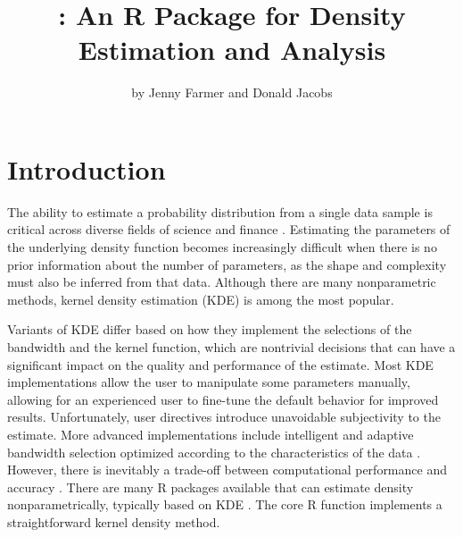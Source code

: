 \title{:  An R Package for Density Estimation and Analysis}
\author{by Jenny Farmer and Donald Jacobs}

\maketitle


\section{Introduction} \label {intro}

The ability to estimate a probability distribution from a single data sample is critical across diverse fields of science and finance \citep{pdf1, pdf2, pdf3, pdf4}.  Estimating the parameters of the underlying density function becomes increasingly difficult when there is no prior information about the number of parameters, as the shape and complexity must also be inferred from that data. Although there are many nonparametric methods, kernel density estimation (KDE) is among the most popular.  

Variants of KDE differ based on how they implement the selections of the bandwidth and the kernel function, which are nontrivial decisions that can have a significant impact on the quality and performance of the estimate.  Most KDE implementations allow the user to manipulate some parameters manually, allowing for an experienced user to fine-tune the default behavior for improved results. Unfortunately, user directives introduce unavoidable subjectivity to the estimate.  More advanced implementations include intelligent and adaptive bandwidth selection optimized according to the characteristics of the data \citep{KDEtutorial, KDEdiffusion}. However, there is inevitably a trade-off between computational performance and accuracy \citep{KDEcomp}. There are many R packages available that can estimate density nonparametrically, typically based on KDE \citep{kdeR1, kdeR2, kdeR3, kdeR4, kdeR5, kernsmooth, densEstBayes, kde1d}. The core R function  implements a straightforward kernel density method.

